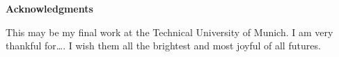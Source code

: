 \thispagestyle{empty}
\vspace*{20mm}

\begin{center}
\textbf{{Acknowledgments}}
\end{center}

\vspace{10mm}

This may be my final work at the Technical University of Munich. I am very thankful for\ldots. I wish them all the brightest and most joyful of all futures.

\cleardoublepage{}
